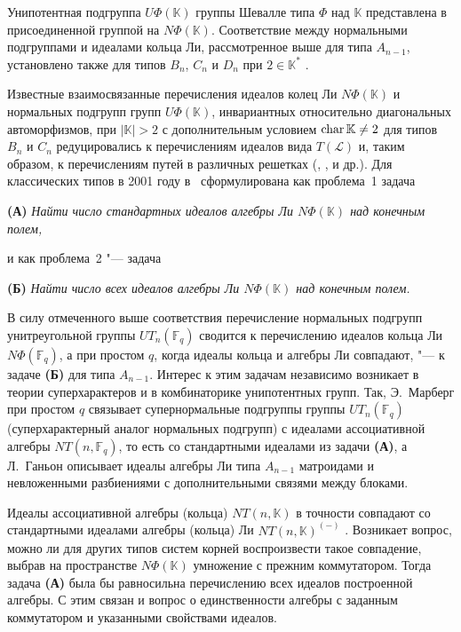 Унипотентная подгруппа $U\Phi(\mathbb{K})$ группы Шевалле типа $\Phi$ над
$\mathbb{K}$ представлена в \cite{vl90a_ru} присоединенной группой на
$N\Phi(\mathbb{K})$. Соответствие между нормальными подгруппами и идеалами
кольца Ли, рассмотренное выше для типа $A_{n-1}$, установлено также для типов
$B_n$, $C_n$ и $D_n$ при $2\in\mathbb{K}^{*}$ \cite[теорема~10]{Lev1992}.

Известные взаимосвязанные перечисления идеалов колец Ли $N\Phi(\mathbb{K})$ и
нормальных подгрупп групп $U\Phi(\mathbb{K})$, инвариантных относительно
диагональных автоморфизмов, при $|\mathbb{K}|>2$ с дополнительным условием
$\operatorname{char}\mathbb{K}\neq2$ для типов $B_n$ и $C_n$ редуцировались к перечислениям
идеалов вида $T(\mathcal{L})$ и, таким образом, к перечислениям путей в
различных решетках (\cite[следствие~4.3]{vL74},
\cite[теорема~2.1.2]{Egorychev77}, \cite{Eg-Lev-1996} и др.). Для классических
типов в 2001 году в~\cite{sigsam2001} сформулирована как проблема~1 задача

\medskip

\noindent\textbf{(А)} \emph{Найти число стандартных идеалов алгебры Ли
    $N\Phi(\mathbb{K})$ над конечным полем,}

\medskip

\noindent и как проблема~2 "--- задача

\medskip

\noindent\textbf{(Б)} \emph{Найти число всех идеалов алгебры Ли
    $N\Phi(\mathbb{K})$ над конечным полем.}

\medskip

В силу отмеченного выше соответствия перечисление нормальных подгрупп
унитреугольной группы $UT_n(\mathbb{F}_q)$ сводится к перечислению идеалов
кольца Ли $N\Phi(\mathbb{F}_q)$, а при простом $q$, когда идеалы кольца и
алгебры Ли совпадают, "--- к задаче \textbf{(Б)} для типа $A_{n-1}$. Интерес к
этим задачам независимо возникает в теории суперхарактеров и в комбинаторике
унипотентных групп. Так, Э.~Марберг \cite[предложения~3.1,~3.2]{margberg2011}
при простом $q$ связывает супернормальные подгруппы группы $UT_n(\mathbb{F}_q)$
(суперхарактерный аналог нормальных подгрупп) с идеалами ассоциативной алгебры
$NT(n,\mathbb{F}_q)$, то есть со стандартными идеалами из задачи \textbf{(А)},
а Л.~Ганьон \cite[теорема~B]{gagnon2021} описывает идеалы алгебры Ли типа
$A_{n-1}$ матроидами и невложенными разбиениями с дополнительными связями между
блоками.

Идеалы ассоциативной алгебры (кольца) $NT(n,\mathbb{K})$ в точности совпадают
со стандартными идеалами алгебры (кольца) Ли $NT(n,\mathbb{K})^{(-)}$
\cite{Dub-Perl-1951,vL74}. Возникает вопрос, можно ли для других типов систем
корней воспроизвести такое совпадение, выбрав на пространстве
$N\Phi(\mathbb{K})$ умножение с прежним коммутатором. Тогда задача \textbf{(А)}
была бы равносильна перечислению всех идеалов построенной алгебры. С этим
связан и вопрос о единственности алгебры с заданным коммутатором и указанными
свойствами идеалов.

